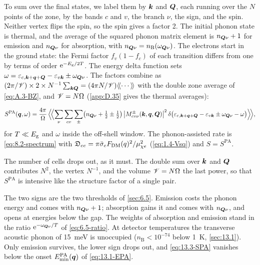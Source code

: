 To sum over the final states, we label them by $\bm{k}$ and $\bm{Q}$, each running over the $N$ points of the zone, by the bands $c$ and $v$, the branch $\nu$, the sign, and the spin. Neither vertex flips the spin, so the spin gives a factor 2. The initial phonon state is thermal, and the average of the squared phonon matrix element is $n_{\bm{Q}\nu} + 1$ for emission and $n_{\bm{Q}\nu}$ for absorption, with $n_{\bm{Q}\nu} = n_{\mathrm{B}}(\omega_{\bm{Q}\nu})$. The electrons start in the ground state: the Fermi factor $f_v(1 - f_c)$ of each transition differs from one by terms of order $\mathrm{e}^{-E_{\mathrm{g}}/2T}$. The energy delta function sets $\omega = \varepsilon_{c,\bm{k}+\bm{q}+\bm{Q}} - \varepsilon_{v\bm{k}} \pm \omega_{\bm{Q}\nu}$. The factors combine as $(2\pi/\mathscr{V})\times2\times N^{-1}\sum_{\bm{k}\bm{Q}} = (4\pi N/\mathscr{V})\langle\!\langle\cdots\rangle\!\rangle$ with the double zone average of \cref{eq:A.3-BZ}, and $\mathscr{V} = N\Omega$ (\cref{app:D.35} gives the thermal averages):
\begin{keyresult}
\begin{equation}
  S^{\mathrm{PA}}(\bm{q},\omega) = \frac{4\pi}{\Omega}\,\Bigl\langle\!\Bigl\langle\sum_\nu\sum_{cv}\sum_\pm\bigl(n_{\bm{Q}\nu} + \tfrac12 \pm \tfrac12\bigr)\,\bigl|M^\pm_{cv\nu}(\bm{k},\bm{q},\bm{Q})\bigr|^2\,\delta\bigl(\varepsilon_{c,\bm{k}+\bm{q}+\bm{Q}} - \varepsilon_{v\bm{k}} \pm \omega_{\bm{Q}\nu} - \omega\bigr)\Bigr\rangle\!\Bigr\rangle ,
  \label{eq:13.3-SPA}
\end{equation}
for $T \ll E_{\mathrm{g}}$ and $\omega$ inside the off-shell window. The phonon-assisted rate is \cref{eq:8.2-spectrum} with $\mathfrak{D}_{ee} = \pi\bar{\sigma}_{e}F_{\mathrm{DM}}(q)^2/\mu_{\chi e}^2$ (\cref{eq:1.4-Vsq}) and $S = S^{\mathrm{PA}}$.
\end{keyresult}
\noindent The number of cells drops out, as it must. The double sum over $\bm{k}$ and $\bm{Q}$ contributes $N^2$, the vertex $N^{-1}$, and the volume $\mathscr{V} = N\Omega$ the last power, so that $S^{\mathrm{PA}}$ is intensive like the structure factor of a single pair.

The two signs are the two thresholds of \cref{sec:6.5}. Emission costs the phonon energy and comes with $n_{\bm{Q}\nu} + 1$; absorption gains it and comes with $n_{\bm{Q}\nu}$, and opens at energies below the gap. The weights of absorption and emission stand in the ratio $\mathrm{e}^{-\omega_{\bm{Q}\nu}/T}$ of \cref{eq:6.5-ratio}. At detector temperatures the transverse acoustic phonon of \SI{15}{meV} is unoccupied ($n_{\mathrm{B}} < 10^{-74}$ below \SI{1}{K}, \cref{sec:13.1}). Only emission survives, the lower sign drops out, and \cref{eq:13.3-SPA} vanishes below the onset $E_{\mathrm{min}}^{\mathrm{PA}}(\bm{q})$ of \cref{eq:13.1-EPA}.

